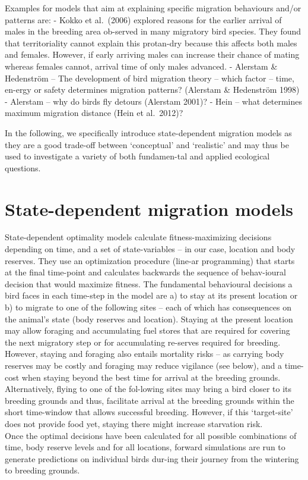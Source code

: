 \documentclass[
]{book}
\begin{document}
Examples for models that aim at explaining specific migration behaviours and/or patterns are:
- Kokko et al.~(2006) explored reasons for the earlier arrival of males in the breeding area ob-served in many migratory bird species. They found that territoriality cannot explain this protan-dry because this affects both males and females. However, if early arriving males can increase their chance of mating whereas females cannot, arrival time of only males advanced.
- Alerstam \& Hedenström -- The development of bird migration theory -- which factor -- time, en-ergy or safety determines migration patterns? (Alerstam \& Hedenström 1998)
- Alerstam -- why do birds fly detours (Alerstam 2001)?
- Hein -- what determines maximum migration distance (Hein et al.~2012)?

In the following, we specifically introduce state-dependent migration models as they are a good trade-off between `conceptual' and `realistic' and may thus be used to investigate a variety of both fundamen-tal and applied ecological questions.

\hypertarget{state-dependent-migration-models}{%
\section{State-dependent migration models}\label{state-dependent-migration-models}}

State-dependent optimality models calculate fitness-maximizing decisions depending on time, and a set of state-variables -- in our case, location and body reserves. They use an optimization procedure (line-ar programming) that starts at the final time-point and calculates backwards the sequence of behav-ioural decision that would maximize fitness.
The fundamental behavioural decisions a bird faces in each time-step in the model are a) to stay at its present location or b) to migrate to one of the following sites -- each of which has consequences on the animal's state (body reserves and location). Staying at the present location may allow foraging and accumulating fuel stores that are required for covering the next migratory step or for accumulating re-serves required for breeding. However, staying and foraging also entails mortality risks -- as carrying body reserves may be costly and foraging may reduce vigilance (see below), and a time-cost when staying beyond the best time for arrival at the breeding grounds. Alternatively, flying to one of the fol-lowing sites may bring a bird closer to its breeding grounds and thus, facilitate arrival at the breeding grounds within the short time-window that allows successful breeding. However, if this `target-site' does not provide food yet, staying there might increase starvation risk.\\
Once the optimal decisions have been calculated for all possible combinations of time, body reserve levels and for all locations, forward simulations are run to generate predictions on individual birds dur-ing their journey from the wintering to breeding grounds.
\end{document}
